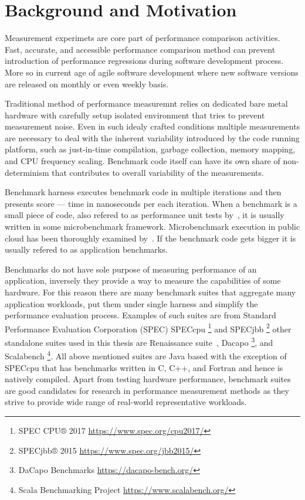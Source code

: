 \chapter{Background and Motivation}
\label{chap:background}

Measurement experimets are core part of performance comparison activities.
Fast, accurate, and accessible  performance comparison method can prevent introduction of performance regressions during software development process.
More so in current age of agile software development where new software versions are released on monthly or even weekly basis.

Traditional method of performance measuremnt relies on dedicated bare metal hardware with carefully setup isolated environment that tries to prevent measurement noise. 
Even in such idealy crafted conditions multiple measurements are necessary to deal with the inherent variability introduced by the code running platform, such as just-in-time compilation, garbage collection, memory mapping, and CPU frequency scaling.
Benchmark code itself can have its own share of non-determinism that contributes to overall variability of the measurements.

Benchmark harness executes benchmark code in multiple iterations and then presents score --- time in nanoseconds per each iteration.
When a benchmark is a small piece of code, also refered to as performance unit tests by~\citet{horky2015unit}, it is usually written in some microbenchmark framework.
Microbenchmark execution in public cloud has been thoroughly examined by~\citet{laaber2019software}.
If the benchmark code gets bigger it is usually refered to as application benchmarks.

Benchmarks do not have sole purpose of measuring performance of an application, inversely they provide a way to measure the capabilities of some hardware.
For this reason there are many benchmark suites that aggregate many application workloads, put them under single harness and simplify the performance evaluation process.
Examples of such suites are from Standard Performance Evaluation Corporation (SPEC) SPECcpu \footnote{SPEC CPU® 2017 \url{https://www.spec.org/cpu2017/}} and SPECjbb \footnote{SPECjbb® 2015 \url{https://www.spec.org/jbb2015/}} other standalone suites used in this thesis are Renaissance suite~\cite{prokopec2019renaissance}, Dacapo \footnote{DaCapo Benchmarks \url{https://dacapo-bench.org/}}, and Scalabench \footnote{Scala Benchmarking Project \url{https://www.scalabench.org/}}.
All above mentioned suites are Java based with the exception of SPECcpu that has benchmarks written in C, C++, and Fortran and hence is natively compiled.
Apart from testing hardware performance, benchmark suites are good candidates for research in performance measurement methods as they strive to provide wide range of real-world representative workloads.


